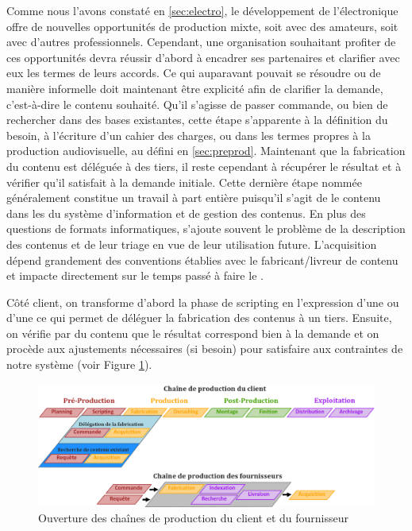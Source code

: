 Comme nous l'avons constaté en \ref{sec:electro}, le développement de l'électronique offre de nouvelles opportunités de production mixte, soit avec des amateurs, soit avec d'autres professionnels. 
Cependant, une organisation souhaitant profiter de ces opportunités devra réussir d'abord à encadrer ses partenaires et clarifier avec eux les termes de leurs accords. 
Ce qui auparavant pouvait se résoudre  ou de manière informelle doit maintenant être explicité afin de clarifier la demande, c'est-à-dire le contenu souhaité. 
Qu'il s'agisse de passer commande, ou bien de rechercher dans des bases existantes, cette étape s'apparente à la définition du besoin, à l'écriture d'un cahier des charges, ou dans les termes propres à la production audiovisuelle, au  défini en \ref{sec:preprod}. 
Maintenant que la fabrication du contenu est déléguée à des tiers, il reste cependant à récupérer le résultat et à vérifier qu'il satisfait à la demande initiale. 
Cette dernière étape nommée généralement  constitue un travail à part entière puisqu'il s'agit de  le contenu dans les  du système d'information et de gestion des contenus. 
En plus des questions de formats informatiques, s'ajoute souvent le problème de la description des contenus et de leur triage en vue de leur utilisation future.  
L'acquisition dépend grandement des conventions établies avec le fabricant/livreur de contenu et impacte directement sur le temps passé à faire le . 

Côté client, on transforme d'abord la phase de scripting en l'expression d'une  ou d'une  ce qui permet de déléguer la fabrication des contenus à un tiers.
Ensuite, on vérifie par  du contenu que le résultat correspond bien à la demande et on procède aux ajustements nécessaires (si besoin) pour satisfaire aux contraintes de notre système (voir Figure \ref{img:intro:evochain}). 

\begin{figure}[ht!]
\centering
\includegraphics[width=\textwidth]{images/Workflow-Thesis-v6.png}
\caption{Ouverture des chaînes de production du client et du fournisseur}
\label{img:intro:evochain}
\end{figure}

